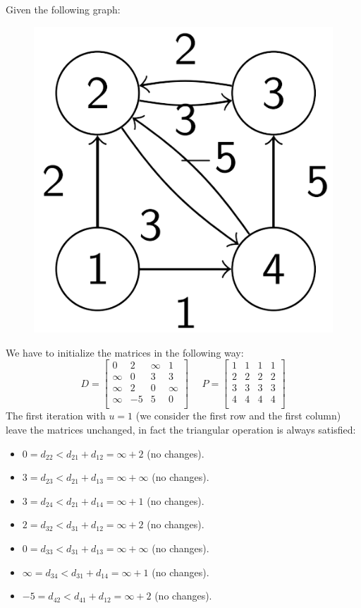 \documentclass[12pt, a4paper]{report}
\begin{document}
    \begin{example}
        Given the following graph: 
        \begin{figure}[H]
            \centering
            \includegraphics[width=0.2\linewidth]{images/floyd.png}
        \end{figure}
        We have to initialize the matrices in the following way: 
        \[D=\begin{bmatrix}
            0 & 2 & \infty & 1 \\
            \infty & 0 & 3 & 3 \\
            \infty & 2 & 0 & \infty \\
            \infty & -5 & 5 & 0 \\
        \end{bmatrix}
        \:\:\:\:\:\:
        P=\begin{bmatrix}
            1 & 1 & 1 & 1 \\
            2 & 2 & 2 & 2 \\
            3 & 3 & 3 & 3 \\
            4 & 4 & 4 & 4 \\
        \end{bmatrix}
        \]
        The first iteration with $u=1$ (we consider the first row and the first column) leave the matrices unchanged, in fact the triangular operation is always satisfied: 
        \begin{itemize}
            \item $0=d_{22} < d_{21} + d_{12} = \infty + 2$ (no changes). 
            \item $3=d_{23} < d_{21} + d_{13} = \infty + \infty$ (no changes). 
            \item $3=d_{24} < d_{21} + d_{14} = \infty + 1$ (no changes). 
            \item $2=d_{32} < d_{31} + d_{12} = \infty + 2$ (no changes). 
            \item $0=d_{33} < d_{31} + d_{13} = \infty + \infty$ (no changes). 
            \item $\infty=d_{34} < d_{31} + d_{14} = \infty + 1$ (no changes). 
            \item $-5=d_{42} < d_{41} + d_{12} = \infty + 2$ (no changes). 

\end{itemize}
\end{example}
\end{document}
